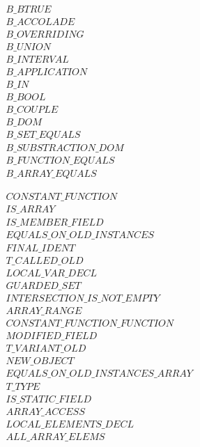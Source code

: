 $\begin{array}{ll}
	B\_BTRUE& \\
	B\_ACCOLADE& \\
	B\_OVERRIDING& \\
	B\_UNION& \\
	B\_INTERVAL& \\
	B\_APPLICATION& \\
	B\_IN& \\
	B\_BOOL& \\
	B\_COUPLE& \\
	B\_DOM& \\
	B\_SET\_EQUALS& \\
	B\_SUBSTRACTION\_DOM& \\
	B\_FUNCTION\_EQUALS& \\
	B\_ARRAY\_EQUALS &
\end{array}$

$\begin{array}{ll}
	CONSTANT\_FUNCTION& \\
	IS\_ARRAY& \\
	IS\_MEMBER\_FIELD& \\
	EQUALS\_ON\_OLD\_INSTANCES& \\
	FINAL\_IDENT& \\
	T\_CALLED\_OLD& \\
	LOCAL\_VAR\_DECL& \\
	GUARDED\_SET& \\
	INTERSECTION\_IS\_NOT\_EMPTY& \\
	ARRAY\_RANGE& \\
	CONSTANT\_FUNCTION\_FUNCTION& \\
	MODIFIED\_FIELD& \\
	T\_VARIANT\_OLD& \\
	NEW\_OBJECT& \\
	EQUALS\_ON\_OLD\_INSTANCES\_ARRAY& \\
	T\_TYPE& \\
	IS\_STATIC\_FIELD& \\
	ARRAY\_ACCESS& \\
	LOCAL\_ELEMENTS\_DECL& \\
	ALL\_ARRAY\_ELEMS
\end{array}$


